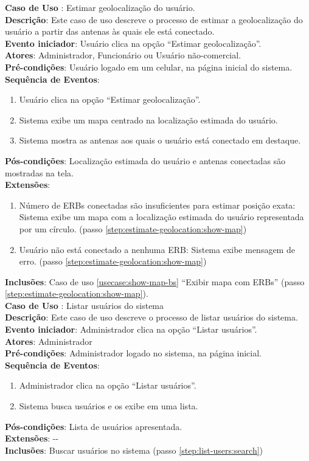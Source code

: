 \documentclass[]{politex}
\begin{document}
\noindent \textbf{Caso de Uso }: Estimar geolocalização do usuário. \\
\textbf{Descrição}: Este caso de uso descreve o processo de estimar a
geolocalização do usuário a partir das antenas às quais ele está conectado. \\
\textbf{Evento iniciador}: Usuário clica na opção ``Estimar geolocalização''. \\
\textbf{Atores}: Administrador, Funcionário ou Usuário não-comercial. \\
\textbf{Pré-condições}: Usuário logado em um celular, na página inicial do
sistema. \\
\textbf{Sequência de Eventos}:
\begin{enumerate}
\item Usuário clica na opção ``Estimar geolocalização''.
\item\label{step:estimate-geolocation:show-map} Sistema exibe um mapa centrado na localização estimada do usuário.
\item Sistema mostra as antenas aos quais o usuário está conectado em destaque.
\end{enumerate}
\textbf{Pós-condições}: Localização estimada do usuário e antenas conectadas são
mostradas na tela. \\
\textbf{Extensões}:
\begin{enumerate}
\item Número de ERBs conectadas são insuficientes para estimar posição exata:
Sistema exibe um mapa com a localização estimada do usuário representada por um
círculo. (passo \ref{step:estimate-geolocation:show-map})
\item Usuário não está conectado a nenhuma ERB: Sistema exibe mensagem de erro.
(passo \ref{step:estimate-geolocation:show-map})
\end{enumerate}
\textbf{Inclusões}: Caso de uso \ref{usecase:show-map-bs} ``Exibir mapa com ERBs'' (passo \ref{step:estimate-geolocation:show-map}). \\

\noindent \textbf{Caso de Uso }: Listar usuários do sistema \\
\textbf{Descrição}: Este caso de uso descreve o processo de listar usuários do
sistema. \\
\textbf{Evento iniciador}: Administrador clica na opção ``Listar usuários''. \\
\textbf{Atores}: Administrador \\
\textbf{Pré-condições}: Administrador logado no sistema, na página inicial. \\
\textbf{Sequência de Eventos}:
\begin{enumerate}
\item Administrador clica na opção ``Listar usuários''.
\item\label{step:list-users:search} Sistema busca usuários e os exibe em uma lista.
\end{enumerate}
\textbf{Pós-condições}: Lista de usuários apresentada. \\
\textbf{Extensões}: -{}- \\
\textbf{Inclusões}: Buscar usuários no sistema (passo \ref{step:list-users:search}) \\
\end{document}
